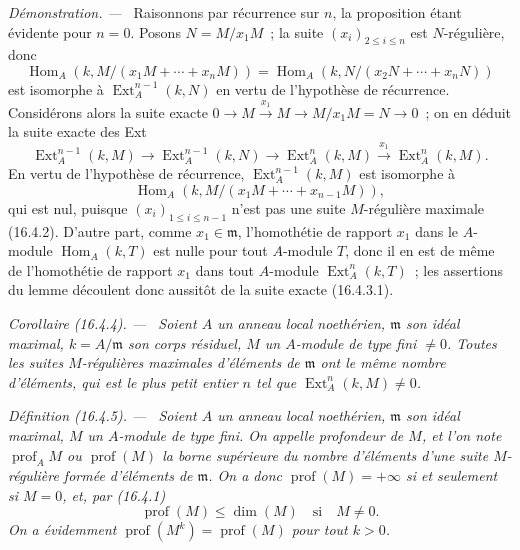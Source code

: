 \documentclass[10pt,oneside]{book}
\makeatletter
\newcommand{\setmanualcurrentlabel}[1]{\def\@currentlabel{#1}}
\newenvironment{definition}[1][]{%
  \setmanualcurrentlabel{#1}\par\medskip\noindent\itshape Définition (#1). ---\ }{\par}
\newenvironment{corollary}[1][]{%
  \setmanualcurrentlabel{#1}\par\medskip\noindent\itshape Corollaire (#1). ---\ }{\par}
\newenvironment{proof}{%
  \par\medskip\noindent\textit{Démonstration. ---\ }}{\par}
\makeatother
\begin{document}
\begin{proof}
Raisonnons par récurrence sur $n$, la proposition étant évidente pour $n=0$.
Posons $N=M/x_1M$~; la suite $(x_i)_{2\leq i\leq n}$ est $N$-régulière, donc
\[
  \operatorname{Hom}_A(k,M/(x_1M+\cdots+x_nM))
  =\operatorname{Hom}_A(k,N/(x_2N+\cdots+x_nN))
\]
est isomorphe à $\operatorname{Ext}^{n-1}_A(k,N)$ en vertu de l'hypothèse de
récurrence. Considérons alors la suite exacte
$0\to M\xrightarrow{x_1}M\to M/x_1M=N\to0$~; on en déduit la suite exacte des
Ext
\begin{equation}
\label{0.16.4.3.1-fr}
\tag{16.4.3.1}
  \operatorname{Ext}^{n-1}_A(k,M)
  \to\operatorname{Ext}^{n-1}_A(k,N)
  \to\operatorname{Ext}^n_A(k,M)
  \xrightarrow{x_1}\operatorname{Ext}^n_A(k,M).
\end{equation}
En vertu de l'hypothèse de récurrence, $\operatorname{Ext}^{n-1}_A(k,M)$ est
isomorphe à
\[
  \operatorname{Hom}_A(k,M/(x_1M+\cdots+x_{n-1}M)),
\]
qui est nul, puisque $(x_i)_{1\leq i\leq n-1}$ n'est pas une suite
$M$-régulière maximale (16.4.2). D'autre part, comme
$x_1\in\mathfrak{m}$, l'homothétie de rapport $x_1$ dans le $A$-module
$\operatorname{Hom}_A(k,T)$ est nulle pour tout $A$-module $T$, donc il en est
de même de l'homothétie de rapport $x_1$ dans tout $A$-module
$\operatorname{Ext}^n_A(k,T)$~; les assertions du lemme découlent donc
aussitôt de la suite exacte (16.4.3.1).
\end{proof}

\begin{corollary}[16.4.4]
\label{0.16.4.4-fr}
Soient $A$ un anneau local noethérien, $\mathfrak{m}$ son idéal maximal,
$k=A/\mathfrak{m}$ son corps résiduel, $M$ un $A$-module de type fini
$\neq0$. Toutes les suites $M$-régulières maximales d'éléments de
$\mathfrak{m}$ ont le même nombre d'éléments, qui est le plus petit entier $n$
tel que $\operatorname{Ext}^n_A(k,M)\neq0$.
\end{corollary}

\begin{definition}[16.4.5]
\label{0.16.4.5-fr}
Soient $A$ un anneau local noethérien, $\mathfrak{m}$ son idéal maximal, $M$ un
$A$-module de type fini. On appelle \emph{profondeur} de $M$, et l'on note
$\operatorname{prof}_A M$ ou $\operatorname{prof}(M)$ la borne supérieure du
nombre d'éléments d'une suite $M$-régulière formée d'éléments de
$\mathfrak{m}$. On a donc $\operatorname{prof}(M)=+\infty$ si et seulement si
$M=0$, et, par (16.4.1)
\begin{equation}
\label{0.16.4.5.1-fr}
\tag{16.4.5.1}
  \operatorname{prof}(M)\leq\dim(M)\quad\text{si}\quad M\neq0.
\end{equation}
On a évidemment $\operatorname{prof}(M^k)=\operatorname{prof}(M)$ pour tout
$k>0$.
\end{definition}
\end{document}
